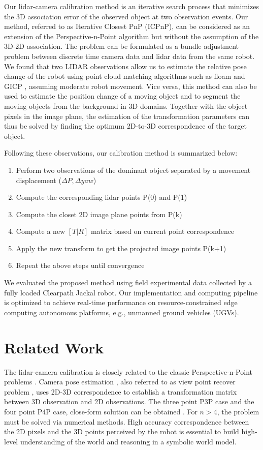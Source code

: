 \documentclass{article}
\begin{document}
Our lidar-camera calibration method is an iterative search process that minimizes the 3D association error of the observed object at two observation events. Our method, referred to as Iterative Closest PnP (ICPnP), can be considered as an extension of the Perspective-n-Point algorithm but without the assumption of the 3D-2D association.
The problem can be formulated as a bundle adjustment problem between discrete time camera data and lidar data from the same robot. 
We found that two LIDAR observations allow us to estimate the relative pose change of the robot using point cloud matching algorithms such as floam \cite{ Zhang-2014-7903} and GICP \cite{gicp}, assuming moderate robot movement. Vice versa, this method can also be used to estimate the position change of a moving object and to segment the moving objects from the background in 3D domains.  Together with the object pixels in the image plane, the estimation of the transformation parameters can thus be solved by finding the optimum 2D-to-3D correspondence of the target object. 
 
Following these observations, our calibration method is summarized below:
\begin{enumerate}
    \item Perform two observations of the dominant object separated by a movement displacement ($\Delta P, \Delta yaw$)
    \item Compute the corresponding lidar points P(0) and P(1)
    \item Compute the closet 2D image plane points from P(k)
    \item Compute a new $[T|R]$ matrix based on current point correspondence
    \item Apply the new transform to get the projected image points P(k+1)
    \item Repeat the above steps until convergence
 \end{enumerate}

 
We evaluated the proposed method using field experimental data collected by a fully loaded Clearpath Jackal robot. Our implementation and computing pipeline is optimized to achieve real-time performance on resource-constrained edge computing autonomous platforms, e.g., unmanned ground vehicles (UGVs).

\section{Related Work}
The lidar-camera calibration is closely related to the classic Perspective-n-Point problems \cite{horn87, low91, quan99}. 
Camera pose estimation \cite{horn87}, also referred to as view point recover problem \cite{low91}, uses 2D-3D correspondence to establish a transformation matrix between 3D observation and 2D observations. The three point P3P case and the four point P4P case, close-form solution can be obtained \cite{horn87}. For $n>4$, the problem must be solved via numerical methods. High accuracy correspondence between the 2D pixels and the 3D points perceived by the robot is essential to build high-level understanding of the world and reasoning in a symbolic world model. 
\end{document}

